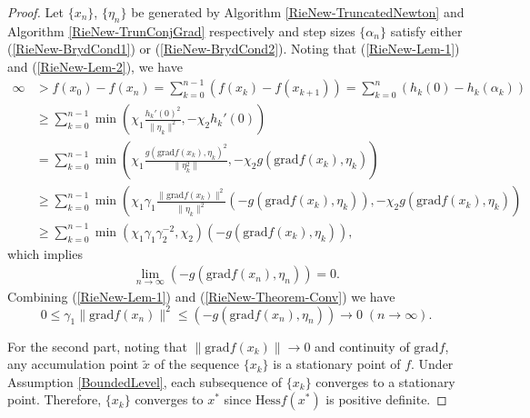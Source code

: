 \documentclass[11pt]{article}
\numberwithin{equation}{section}
\begin{document}
  \begin{proof}
    Let $\{x_n\}$, $\{\eta_n\}$ be generated by Algorithm \ref{RieNew-TruncatedNewton} and Algorithm \ref{RieNew-TrunConjGrad} respectively and step sizes $\{\alpha_n\}$ satisfy either (\ref{RieNew-BrydCond1}) or (\ref{RieNew-BrydCond2}). Noting that (\ref{RieNew-Lem-1}) and (\ref{RieNew-Lem-2}), we have 
    \begin{align*}
      \infty & > f(x_0) - f(x_{n})=\sum\limits_{k=0}^{n-1}(f(x_{k})-f(x_{k+1}))=\sum\limits_{k=0}^{n}(h_k(0)-h_{k}(\alpha_{k})) \\ & \ge \sum\limits_{k=0}^{n-1}\min \left(\chi_{1}\frac{h_{k}'(0)^{2}}{\|\eta_{k}\|^{2}},-\chi_{2}h_{k}'(0) \right) \\ &=\sum\limits_{k=0}^{n-1}\min \left( \chi_{1}\frac{g(\mathrm{grad}f(x_{k}),\eta_{k})^{2}}{\|\eta_{k}^{2}\|}, -\chi_{2}g(\mathrm{grad}f(x_{k}),\eta_{k}) \right) \\ & \ge \sum\limits_{k=0}^{n-1}\min \left( \chi_{1}\gamma_{1}\frac{\|\mathrm{grad}f(x_{k})\|^{2}}{\|\eta_{k}\|^{2}}(-g(\mathrm{grad}f(x_{k}),\eta_{k})), -\chi_{2}g(\mathrm{grad}f(x_{k}),\eta_{k}) \right) \\ & \ge \sum\limits_{k=0}^{n-1}\min \left(\chi_{1}{\gamma_{1}}{\gamma_{2}^{-2}},\chi_{2} \right)(-g(\mathrm{grad}f(x_{k}),\eta_{k})),
    \end{align*}
    which implies 
    \begin{align}
      \lim_{n \rightarrow \infty}(-g(\mathrm{grad}f(x_n),\eta_n))=0. \label{RieNew-Theorem-Conv}
    \end{align}
    Combining (\ref{RieNew-Lem-1}) and (\ref{RieNew-Theorem-Conv}) we have 
    \[
      0\le \gamma_1 \|\mathrm{grad}f(x_n)\|^2\le  (-g(\mathrm{grad}f(x_n),\eta_n)) \rightarrow 0 \;(n \rightarrow \infty).
      \]
          
  For the second part, noting that $\|\mathrm{grad}f(x_k)\|\rightarrow 0$ and continuity of $\mathrm{grad}f$, any accumulation point $\tilde{x}$ of the sequence $\{x_k\}$ is a stationary point of $f$. Under Assumption \ref{BoundedLevel}, each subsequence of $\{x_k\}$ converges to a stationary point. Therefore, $\{x_k\}$ converges to $x^*$ since $\mathrm{Hess}f(x^*)$ is positive definite.
  \end{proof}
\end{document}
